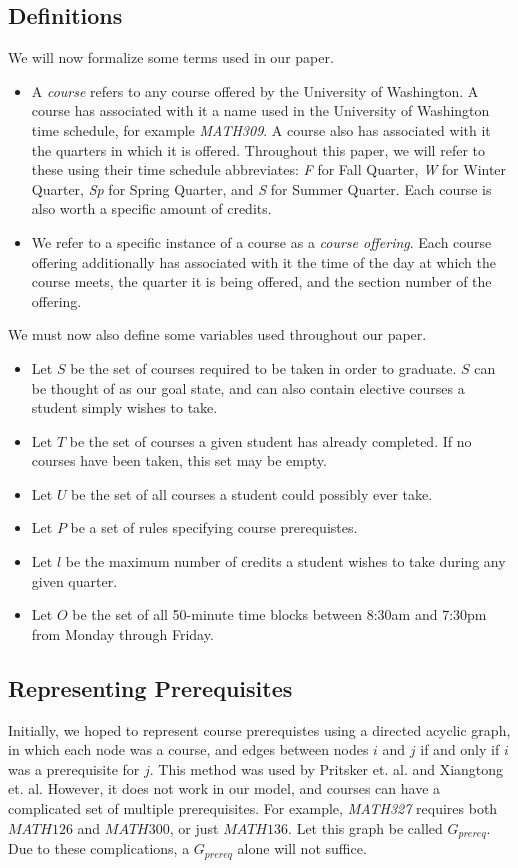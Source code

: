\documentclass[11pt]{article} %
\begin{document}
\subsection{Definitions}
We will now formalize some terms used in our paper.
\begin{itemize}
\item A {\it course} refers to any course offered by the University of Washington. A course has associated with it a name used in the University of Washington time schedule, for example {\it MATH309}. A course also has associated with it the quarters in which it is offered. Throughout this paper, we will refer to these using their time schedule abbreviates: {\it F} for Fall Quarter, {\it W} for Winter Quarter, {\it Sp} for Spring Quarter, and {\it S} for Summer Quarter. Each course is also worth a specific amount of credits.
\item We refer to a specific instance of a course as a {\it course offering}. Each course offering additionally has associated with it the time of the day at which the course meets, the quarter it is being offered, and the section number of the offering.
\end{itemize}

We must now also define some variables used throughout our paper.
\begin{itemize}
\item Let $S$ be the set of courses required to be taken in order to graduate. $S$ can be thought of as our goal state, and can also contain elective courses a student simply wishes to take.
\item Let $T$ be the set of courses a given student has already completed. If no courses have been taken, this set may be empty.
\item Let $U$ be the set of all courses a student could possibly ever take.
\item Let $P$ be a set of rules specifying course prerequistes.
\item Let $l$ be the maximum number of credits a student wishes to take during any given quarter.
\item Let $O$ be the set of all 50-minute time blocks between 8:30am and 7:30pm from Monday through Friday.
\end{itemize}

\subsection{Representing Prerequisites}
Initially, we hoped to represent course prerequistes using a directed acyclic graph, in which each node was a course, and edges between nodes $i$ and $j$ if and only if $i$ was a prerequisite for $j$.  This method was used by Pritsker et. al. and Xiangtong et. al. However, it does not work in our model, and courses can have a complicated set of multiple prerequisites. For example, {\it MATH327} requires both $MATH126$ and $MATH300$, or just $MATH136$. Let this graph be called $G_{prereq}$. Due to these complications, a $G_{prereq}$ alone will not suffice.
\end{document}
